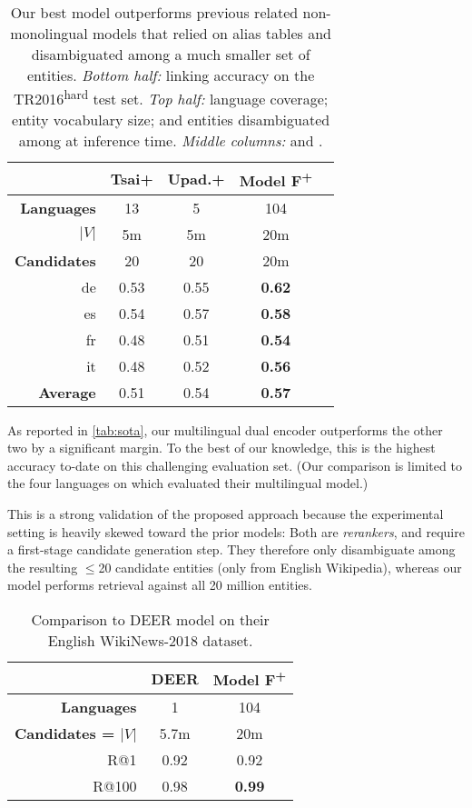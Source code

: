 \documentclass[11pt,a4paper]{article}
\newcommand*{\TR}{TR2016\textsuperscript{hard}}
\begin{document}
\begin{table}
\small
\centering
\begin{tabular}{r cccc} \toprule
 & \textbf{Tsai+} & \textbf{Upad.+} & \textbf{Model F\textsuperscript{+}}\\ \midrule
\textbf{Languages} & 13 & 5 & 104 \\ 
\textbf{$|V|$} & 5m & 5m & 20m \\
\textbf{Candidates}  & 20 & 20 & 20m \\ \midrule
de & 0.53 & 0.55 & \textbf{0.62} \\
es & 0.54 & 0.57 & \textbf{0.58} \\
fr & 0.48 & 0.51 & \textbf{0.54} \\
it & 0.48 & 0.52 & \textbf{0.56} \\ \midrule
\textbf{Average} & 0.51 & 0.54 & \textbf{0.57} \\ \bottomrule
\end{tabular}
\caption{Our best model outperforms previous related non-monolingual models that relied on alias tables and disambiguated among a much smaller set of entities.
\emph{Bottom half:} linking accuracy on the \TR{} test set. 
\emph{Top half:} language coverage; entity vocabulary size; and entities disambiguated among at inference time.
\emph{Middle columns:} \citep{tsai-roth-2016-cross} and \citep{ upadhyay-etal-2018-joint}.
\label{tab:sota}}
\end{table}


As reported in \autoref{tab:sota}, our multilingual dual encoder outperforms the other two by a significant margin.
To the best of our knowledge, this is the highest accuracy to-date on this challenging evaluation set. (Our comparison is limited to the four languages on which  evaluated their multilingual model.)

This is a strong validation of the proposed approach because the experimental setting is heavily skewed toward the prior models:
Both are \emph{rerankers}, and require a first-stage candidate generation step.
They therefore only disambiguate among the resulting $\leq$20 candidate entities (only from English Wikipedia), whereas our model performs retrieval against all 20 million entities.


\begin{table}
\centering
\begin{tabular}{r cc} \toprule
 & \textbf{DEER} &  \textbf{Model F\textsuperscript{+}} \\ \midrule
\textbf{Languages} & 1 & 104 \\ 
\textbf{Candidates = $|V|$} & 5.7m & 20m \\ \midrule
R@1    & 0.92 & 0.92 \\
R@100  & 0.98 & \textbf{0.99} \\ \bottomrule
\end{tabular}
\caption{Comparison to DEER model \citep{gillick-etal-2019-learning} on their English WikiNews-2018 dataset.
\label{tab:flare_wikinews}}
\end{table}
\end{document}

